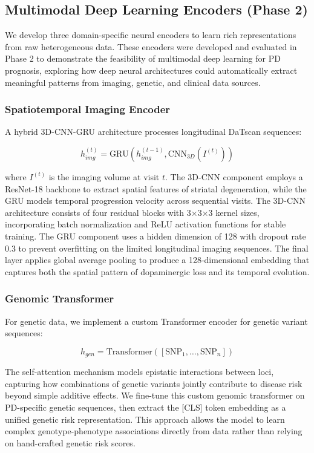 \documentclass[journal,twoside,web]{ieeecolor}
\begin{document}
\subsection{Multimodal Deep Learning Encoders (Phase 2)}

We develop three domain-specific neural encoders to learn rich representations from raw heterogeneous data. These encoders were developed and evaluated in Phase 2 to demonstrate the feasibility of multimodal deep learning for PD prognosis, exploring how deep neural architectures could automatically extract meaningful patterns from imaging, genetic, and clinical data sources.

\subsubsection{Spatiotemporal Imaging Encoder}
A hybrid 3D-CNN-GRU architecture processes longitudinal DaTscan sequences:

\begin{equation}
h_{img}^{(t)} = \text{GRU}(h_{img}^{(t-1)}, \text{CNN}_{3D}(I^{(t)}))
\end{equation}

where $I^{(t)}$ is the imaging volume at visit $t$. The 3D-CNN component employs a ResNet-18 backbone to extract spatial features of striatal degeneration, while the GRU models temporal progression velocity across sequential visits. The 3D-CNN architecture consists of four residual blocks with 3$\times$3$\times$3 kernel sizes, incorporating batch normalization and ReLU activation functions for stable training. The GRU component uses a hidden dimension of 128 with dropout rate 0.3 to prevent overfitting on the limited longitudinal imaging sequences. The final layer applies global average pooling to produce a 128-dimensional embedding that captures both the spatial pattern of dopaminergic loss and its temporal evolution.

\subsubsection{Genomic Transformer}
For genetic data, we implement a custom Transformer encoder for genetic variant sequences:

\begin{equation}
h_{gen} = \text{Transformer}([\text{SNP}_1, \ldots, \text{SNP}_n])
\end{equation}

The self-attention mechanism models epistatic interactions between loci, capturing how combinations of genetic variants jointly contribute to disease risk beyond simple additive effects. We fine-tune this custom genomic transformer on PD-specific genetic sequences, then extract the [CLS] token embedding as a unified genetic risk representation. This approach allows the model to learn complex genotype-phenotype associations directly from data rather than relying on hand-crafted genetic risk scores.
\end{document}
